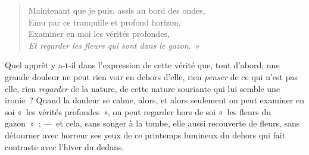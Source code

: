 \documentclass[french,twoside]{book} %
\begin{document}
\begin{verse}
Maintenant que je puis, assis au bord des ondes,\\
Emu par ce tranquille et profond horizon,\\
Examiner en moi les vérités profondes,\\
\emph{Et regarder les fleurs qui sont dans le gazon}. »\\
\end{verse}

\noindent Quel apprêt y a-t-il dans l’expression de cette vérité que, tout d’abord, une grande douleur ne peut rien voir en dehors d’elle, rien \emph{penser} de ce qui n’est pas elle, rien \emph{regarder} de la nature, de cette nature souriante qui lui semble une ironie ? Quand la douleur se calme, alors, et alors seulement on peut examiner en soi « les vérités profondes », on peut regarder hors de soi « les fleurs du gazon » ; — et cela, sans songer à la tombe, elle aussi recouverte de fleurs, sans détourner avec horreur ses yeux de ce printemps lumineux du dehors qui fait contraste avec l’hiver du dedans.\par
\end{document}
